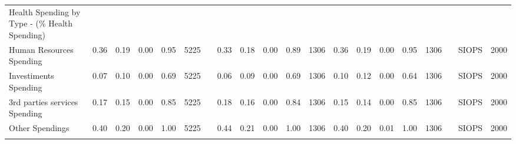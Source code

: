 \begin{sidewaystable}
\begin{table}[H]
\begin{footnotesize}
\begin{center}
{\begin{threeparttable}[b]
\begin{tabular}{rrrrrrrrrrrrrrrrrrrr}
    \multicolumn{1}{l}{Health Spending by Type - (\% Health Spending)} &       &       &       &       &       &       &       &       &       &       &       &       &       &       &       &       &       &       &  \\
    \multicolumn{1}{l}{Human Resources Spending} & \multicolumn{1}{c}{0.36} & \multicolumn{1}{c}{0.19} & \multicolumn{1}{c}{0.00} & \multicolumn{1}{c}{0.95} & \multicolumn{1}{c}{5225} &       & \multicolumn{1}{c}{0.33} & \multicolumn{1}{c}{0.18} & \multicolumn{1}{c}{0.00} & \multicolumn{1}{c}{0.89} & \multicolumn{1}{c}{1306} & \multicolumn{1}{c}{0.36} & \multicolumn{1}{c}{0.19} & \multicolumn{1}{c}{0.00} & \multicolumn{1}{c}{0.95} & \multicolumn{1}{c}{1306} &       & \multicolumn{1}{c}{SIOPS} & \multicolumn{1}{c}{2000} \\
    \multicolumn{1}{l}{Investiments Spending} & \multicolumn{1}{c}{0.07} & \multicolumn{1}{c}{0.10} & \multicolumn{1}{c}{0.00} & \multicolumn{1}{c}{0.69} & \multicolumn{1}{c}{5225} &       & \multicolumn{1}{c}{0.06} & \multicolumn{1}{c}{0.09} & \multicolumn{1}{c}{0.00} & \multicolumn{1}{c}{0.69} & \multicolumn{1}{c}{1306} & \multicolumn{1}{c}{0.10} & \multicolumn{1}{c}{0.12} & \multicolumn{1}{c}{0.00} & \multicolumn{1}{c}{0.64} & \multicolumn{1}{c}{1306} &       & \multicolumn{1}{c}{SIOPS} & \multicolumn{1}{c}{2000} \\
    \multicolumn{1}{l}{3rd parties services Spending} & \multicolumn{1}{c}{0.17} & \multicolumn{1}{c}{0.15} & \multicolumn{1}{c}{0.00} & \multicolumn{1}{c}{0.85} & \multicolumn{1}{c}{5225} &       & \multicolumn{1}{c}{0.18} & \multicolumn{1}{c}{0.16} & \multicolumn{1}{c}{0.00} & \multicolumn{1}{c}{0.84} & \multicolumn{1}{c}{1306} & \multicolumn{1}{c}{0.15} & \multicolumn{1}{c}{0.14} & \multicolumn{1}{c}{0.00} & \multicolumn{1}{c}{0.85} & \multicolumn{1}{c}{1306} &       & \multicolumn{1}{c}{SIOPS} & \multicolumn{1}{c}{2000} \\
    \multicolumn{1}{l}{Other Spendings} & \multicolumn{1}{c}{0.40} & \multicolumn{1}{c}{0.20} & \multicolumn{1}{c}{0.00} & \multicolumn{1}{c}{1.00} & \multicolumn{1}{c}{5225} &       & \multicolumn{1}{c}{0.44} & \multicolumn{1}{c}{0.21} & \multicolumn{1}{c}{0.00} & \multicolumn{1}{c}{1.00} & \multicolumn{1}{c}{1306} & \multicolumn{1}{c}{0.40} & \multicolumn{1}{c}{0.20} & \multicolumn{1}{c}{0.01} & \multicolumn{1}{c}{1.00} & \multicolumn{1}{c}{1306} &       & \multicolumn{1}{c}{SIOPS} & \multicolumn{1}{c}{2000} \\
          &       &       &       &       &       &       &       &       &       &       &       &       &       &       &       &       &       &       &  \\

\end{tabular}
\end{threeparttable}}
\end{center}
\end{footnotesize}
\end{table}
\end{sidewaystable}
